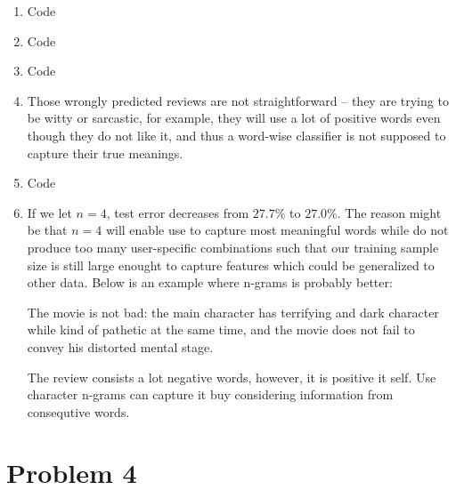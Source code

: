 \documentclass[12pt]{article}
\begin{document}
\begin{enumerate}[label=(\alph*)]
  \item Code
  \item Code
  \item Code
  \item Those wrongly predicted reviews are not straightforward -- they are trying to be witty or sarcastic, for example, they will use a lot of positive words even though they do not like it,  and thus a word-wise classifier is not supposed to capture their true meanings.
  \item Code
  \item If we let $n = 4$, test error decreases from $27.7\%$ to $27.0\%$. The reason might be  that $n = 4$ will enable use to capture most meaningful words while do not produce too many user-specific combinations such that our training sample size is still large enought to capture features which could be generalized to other data.  Below is an example where n-grams is probably better:
  
 The movie is not bad: the main character has terrifying and dark character while kind of pathetic at the same time, and the movie does not fail to convey his distorted mental stage.
  
 The review consists a lot negative words, however, it is positive it self. Use character n-grams can capture it buy considering information from consequtive words.
\end{enumerate}

\section*{Problem 4}
\end{document}
